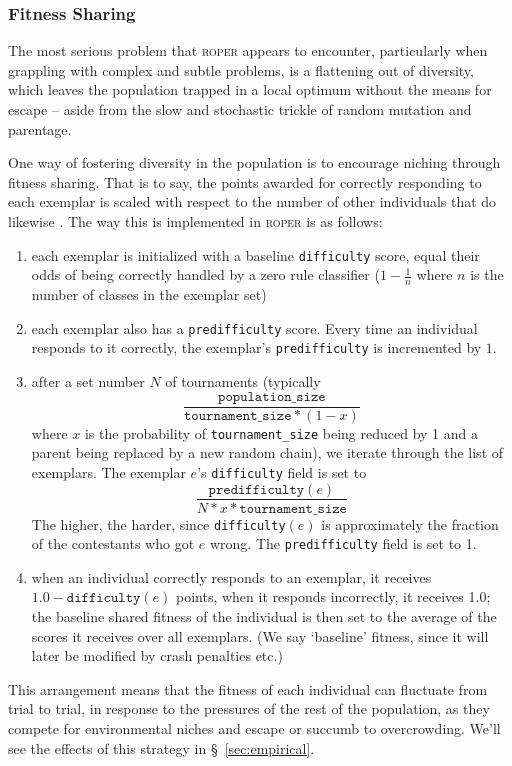 \subsubsection{Fitness Sharing}

The most serious problem that \textsc{roper} appears to
encounter, particularly when grappling with complex and subtle
problems, is a flattening out of diversity, which leaves the
population trapped in a local optimum without the means for
escape -- aside from the slow and stochastic trickle of random
mutation and parentage. 

One way of fostering diversity in the population is to encourage
niching through fitness sharing. That is to say, the points awarded for correctly responding to each exemplar is scaled with respect to the number of other individuals that do likewise \cite{rosin97,mckay00}. The way this is implemented in \textsc{roper} is as follows:
{\small
\begin{enumerate}

    \item each exemplar is initialized with a baseline
      \texttt{difficulty} score, equal their odds of being
      correctly handled by a zero rule classifier ($1-\frac{1}{n}$
      where $n$ is the number of classes in the exemplar set)

    \item each exemplar also has a \texttt{predifficulty} score.
      Every time an individual responds to it correctly, the
      exemplar's \texttt{predifficulty} is incremented by $1$.

    \item after a set number $N$ of tournaments (typically
      $$\frac{\texttt{population\_size}}{\texttt{tournament\_size}
      * (1 - x)}$$
      where $x$ is the probability of
      \texttt{tournament\_size} being reduced by 1 and a parent being
      replaced by a new random chain), we iterate through
      the list of exemplars. The exemplar $e$'s \texttt{difficulty}
      field is set to
      $$\frac{\texttt{predifficulty}(e)}{N * x *
      \texttt{tournament\_size}}$$ The higher, the harder, since
      \texttt{difficulty}$(e)$ is approximately 
      the fraction of the contestants who got $e$ wrong.
      The \texttt{predifficulty}
      field is set to 1.  

    \item when an individual correctly responds to an exemplar,
      it receives $1.0 - \texttt{difficulty}(e)$ points, when it responds
      incorrectly, it receives 1.0; the baseline shared
     fitness of the individual is then set to the average of the
      scores it receives over all exemplars. (We say
      `baseline' fitness, since it will later be modified by crash
      penalties etc.)
\end{enumerate}
}
This arrangement means that the fitness of each individual can
fluctuate from trial to trial, in response to the pressures of
the rest of the population, as they compete for environmental
niches and escape or succumb to overcrowding. We'll see the
effects of this strategy in \S~\ref{sec:empirical}.

